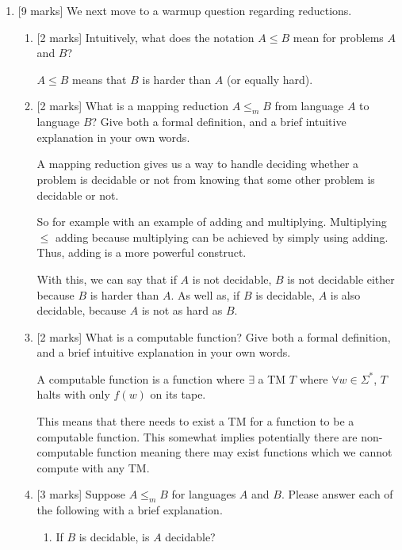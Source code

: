 \documentclass{article}
\begin{document}
\begin{enumerate}
\begin{enumerate}
    \end{enumerate}
    \item {[9 marks]} We next move to a warmup question regarding reductions.
        \begin{enumerate}
            \item {[2 marks]} Intuitively, what does the notation $A\leq B$ mean for problems $A$ and $B$?

                    $A \leq B$ means that $B$ is harder than $A$ (or equally hard).

            \item {[2 marks]} What is a mapping reduction $A\leq_m B$ from language $A$ to language $B$? Give both a formal definition, and a brief intuitive explanation in your own words.

                            A mapping reduction gives us a way to handle deciding whether a problem is decidable or not from knowing that some other problem is decidable or not.

                            So for example with an example of adding and multiplying.
                            Multiplying $\leq$ adding because multiplying can be achieved by simply using adding. Thus, adding is a more powerful construct.

                            With this, we can say that if $A$ is not decidable, $B$ is not decidable either because $B$ is harder than $A$. As well as, if $B$ is decidable, $A$ is also decidable, because $A$ is not as hard as $B$.

            \item {[2 marks]} What is a computable function? Give both a formal definition, and a brief intuitive explanation in your own words.

            		A computable function is a function where $\exists$ a TM $T$ where $\forall w \in \Sigma^*$, $T$ halts with only $f(w)$ on its tape.

                    This means that there needs to exist a TM for a function to be a computable function. This somewhat implies potentially there are non-computable function meaning there may exist functions which we cannot compute with any TM.

            \item {[3 marks]} Suppose $A\leq_m B$ for languages $A$ and $B$. Please answer each of the following with a brief explanation.
                \begin{enumerate}
                    \item If $B$ is decidable, is $A$ decidable?


\end{enumerate}
\end{enumerate}
\end{enumerate}
\end{document}
